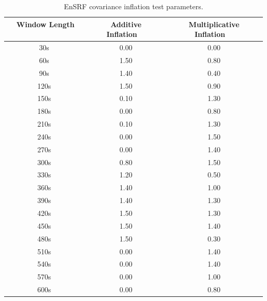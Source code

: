 \documentclass[12pt]{report}
\begin{document}
\begin{table}[h!]
\caption[EnSRF covariance inflation test parameters]{EnSRF covariance inflation test parameters.}
\begin{center}
\begin{tabular}{ccc}
\hline
{\bf Window Length ~~~~} & {\bf Additive Inflation~~} & {\bf Multiplicative Inflation~~}\\
\hline
\hline
~30s ~& 0.00 & 0.00 \\ \hline
~60s ~& 1.50 & 0.80 \\ \hline
~90s ~& 1.40 & 0.40 \\ \hline
~120s ~& 1.50 & 0.90 \\ \hline
~150s ~& 0.10 & 1.30 \\ \hline
~180s ~& 0.00 & 0.80 \\ \hline
~210s ~& 0.10 & 1.30 \\ \hline
~240s ~& 0.00 & 1.50 \\ \hline
~270s ~& 0.00 & 1.40 \\ \hline
~300s ~& 0.80 & 1.50 \\ \hline
~330s ~& 1.20 & 0.50 \\ \hline
~360s ~& 1.40 & 1.00 \\ \hline
~390s ~& 1.40 & 1.30 \\ \hline
~420s ~& 1.50 & 1.30 \\ \hline
~450s ~& 1.50 & 1.40 \\ \hline
~480s ~& 1.50 & 0.30 \\ \hline
~510s ~& 0.00 & 1.40 \\ \hline
~540s ~& 0.00 & 1.40 \\ \hline
~570s ~& 0.00 & 1.00 \\ \hline
~600s ~& 0.00 & 0.80 \\ 
\hline
\end{tabular}
\end{center}
\label{table:EnSRFCovInfl}
\end{table} 
\end{document}
